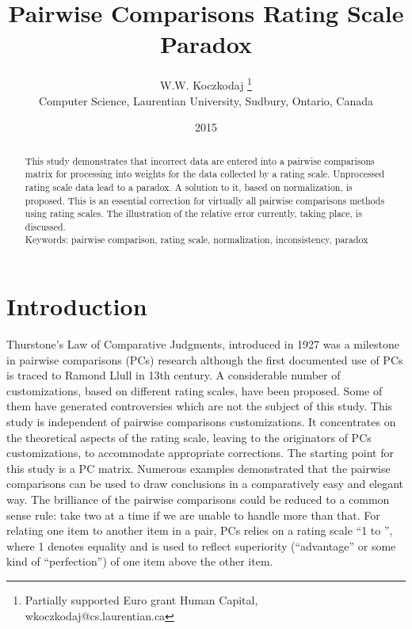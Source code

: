 \documentclass [12pt]{article}
\begin{document}
\title{Pairwise Comparisons Rating Scale Paradox}

\author{W.W. Koczkodaj \footnote{Partially supported Euro grant Human Capital, wkoczkodaj@cs.laurentian.ca}\\
 Computer Science, Laurentian University,  Sudbury, Ontario, Canada}
 
\date{2015}
\maketitle
\begin{abstract}
This study demonstrates that incorrect data are entered into a pairwise comparisons matrix for processing into weights for the data collected by a rating scale. 
Unprocessed rating scale data lead to a paradox. A solution to it, based on normalization, is proposed. This is an essential correction for virtually all pairwise comparisons methods using rating scales. The illustration of the relative error currently, taking place, is discussed. \\

\noindent Keywords: pairwise comparison, rating scale, normalization, inconsistency, paradox \\ \end{abstract}

\section{Introduction}

Thurstone's Law of Comparative Judgments, introduced \cite{Thurstone1927} in 1927 was a milestone in pairwise comparisons (PCs) research although the first documented use of PCs is traced to Ramond Llull in 13th century. A considerable number of customizations, based on different rating scales, have been proposed. Some of them have generated controversies which are not the subject of this study. This study is independent of pairwise comparisons customizations. It concentrates on the theoretical aspects of the rating scale, leaving to the originators of PCs customizations, to accommodate appropriate corrections. The starting point for this study is a PC matrix. Numerous examples demonstrated that the pairwise comparisons can be used to draw conclusions in a comparatively easy and elegant way. The brilliance of the pairwise comparisons could be reduced to a common sense rule: take two at a time if we are unable to handle more than that. For relating one item to another item in a pair, PCs relies on a rating scale ``1 to '', where 1 denotes equality and  is used to reflect superiority (``advantage'' or some kind of ``perfection'') of one item above the other item.
\end{document}
